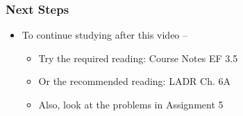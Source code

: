 \documentclass[10pt,english,aspectratio=169]{beamer}
\begin{document}
\begin{frame} \frametitle{Next Steps}

\begin{itemize}
\setlength\itemsep{5mm}
\item To continue studying after this video -- \vspace{2mm}

\begin{itemize}
 \setlength\itemsep{3mm}
 \item Try the required reading: Course Notes EF 3.5
 \item Or the recommended reading: LADR Ch. 6A
 \item Also, look at the problems in Assignment 5
\end{itemize}
\end{itemize}


\end{frame}
\end{document}
